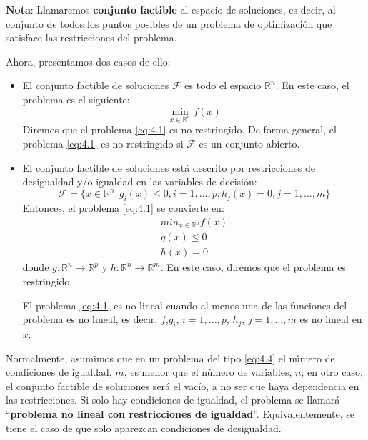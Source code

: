 \textbf{Nota}: Llamaremos \textbf{conjunto factible} al espacio de soluciones, es decir, al conjunto de todos los puntos posibles de un problema de optimización que satisface las restricciones del problema. 


Ahora, presentamos dos casos de ello:
\begin{itemize}
	\item El conjunto factible de soluciones $\mathcal{F}$ es todo el espacio $\mathbb{R}^n$. 
En este caso, el problema es el siguiente:
\begin{equation}
\min_{x\in\mathbb{R}^n}f(x)
\label{eq:4.2}
\end{equation}
Diremos que el problema \ref{eq:4.1} es no restringido. 
De forma general, el problema \ref{eq:4.1} es no restringido si $\mathcal{F}$ es un conjunto abierto.

	\item El conjunto factible de soluciones está descrito por restricciones de desigualdad y/o igualdad en las variables de decisión:
\begin{equation}
\mathcal{F} = \{x\in\mathbb{R}^n : g_i(x)\leq 0, i = 1,...,p; h_j(x)=0,j=1,...,m\}
\label{eq:4.3}
\end{equation}
Entonces, el problema \ref{eq:4.1} se convierte en:
\begin{equation}
 \begin{matrix}
  min_{x\in\mathbb{R}^n}f(x)\\
  g(x) \leq 0\\
  h(x) = 0
 \end{matrix}
\label{eq:4.4}
\end{equation}
donde $g:\mathbb{R}^n\xrightarrow{}{}\mathbb{R}^p$ y $h:\mathbb{R}^n\xrightarrow{}{}\mathbb{R}^m$. 
En este caso, diremos que el problema es restringido. 

El problema \ref{eq:4.1} es no lineal cuando al menos una de las funciones del problema es no lineal, es decir, $f$,$g_i$, $i=1,...,p$, $h_j$, $j=1,...,m$ es no lineal en $x$.

\end{itemize}

Normalmente, asumimos que en un  problema del tipo \ref{eq:4.4} el número de condiciones de igualdad, $m$, es menor que el número de variables, $n$; en otro caso, el conjunto factible de soluciones será el vacío, a no ser que haya dependencia en las restricciones. 
Si solo hay condiciones de igualdad, el problema se llamará ``\textbf{problema no lineal con restricciones de igualdad}''. 
Equivalentemente, se tiene el caso de que solo aparezcan condiciones de desigualdad. 

